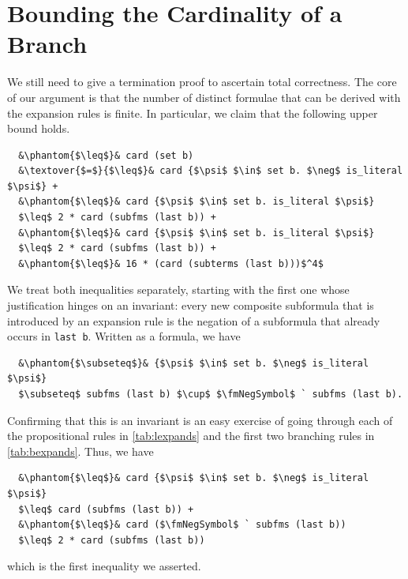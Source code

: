 \documentclass[
  sigplan,
  10pt,
  ]{acmart}
\newcommand{\textover}[3][l]{%
 \makebox[\widthof{#3}][#1]{#2}%
}
\newcommand{\fmNegSymbol}{\boldsymbol{\neg}}
\begin{document}
\section{Bounding the Cardinality of a Branch\label{sec:bound}}
We still need to give a termination proof to ascertain total correctness.
The core of our argument is that the number of distinct formulae that can be derived with the expansion rules is finite.
In particular, we claim that the following upper bound holds.
\begin{lstlisting}
  &\phantom{$\leq$}& card (set b)
  &\textover{$=$}{$\leq$}& card {$\psi$ $\in$ set b. $\neg$ is_literal $\psi$} +
  &\phantom{$\leq$}& card {$\psi$ $\in$ set b. is_literal $\psi$}
  $\leq$ 2 * card (subfms (last b)) +
  &\phantom{$\leq$}& card {$\psi$ $\in$ set b. is_literal $\psi$}
  $\leq$ 2 * card (subfms (last b)) +
  &\phantom{$\leq$}& 16 * (card (subterms (last b)))$^4$
\end{lstlisting}
We treat both inequalities separately, starting with the first one whose justification hinges on an invariant: 
every new composite subformula that is introduced by an expansion rule is the negation of a subformula that already occurs in \lstinline!last b!.
Written as a formula, we have
\begin{lstlisting}
  &\phantom{$\subseteq$}& {$\psi$ $\in$ set b. $\neg$ is_literal $\psi$}
  $\subseteq$ subfms (last b) $\cup$ $\fmNegSymbol$ ` subfms (last b).
\end{lstlisting}
Confirming that this is an invariant is an easy exercise of going through each of the propositional rules in \autoref{tab:lexpands} and the first two branching rules in \autoref{tab:bexpands}.
Thus, we have
\begin{lstlisting}
  &\phantom{$\leq$}& card {$\psi$ $\in$ set b. $\neg$ is_literal $\psi$}
  $\leq$ card (subfms (last b)) +
  &\phantom{$\leq$}& card ($\fmNegSymbol$ ` subfms (last b))
  $\leq$ 2 * card (subfms (last b))
\end{lstlisting}
which is the first inequality we asserted. 
\end{document}
